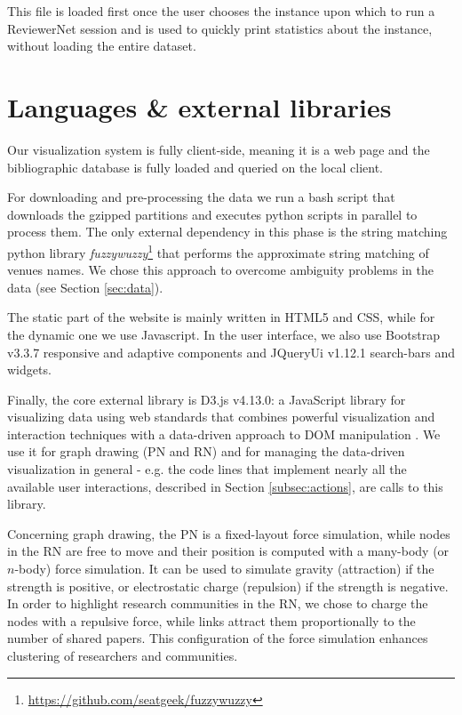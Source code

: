 This file is loaded first once the user chooses the instance upon which to run a ReviewerNet session and is used to quickly print statistics about the instance, without loading the entire dataset.
\section{Languages \& external libraries}
\label{sec:lang}

Our visualization system is fully client-side, meaning it is a web page and the bibliographic database is fully loaded and queried on the local client.

For downloading and pre-processing the data we run a bash script that downloads the gzipped partitions and executes python scripts in parallel to process them. The only external dependency in this phase is the string matching python library \emph{fuzzywuzzy}\footnote{\url{https://github.com/seatgeek/fuzzywuzzy}} that performs the approximate string matching of venues names. We chose this approach to overcome ambiguity problems in the data (see Section \ref{sec:data}).

The static part of the website is mainly written in HTML5 and CSS, while for the dynamic one we use Javascript. In the user interface, we also use Bootstrap v3.3.7 responsive and adaptive components and JQueryUi v1.12.1 search-bars and widgets.

Finally, the core external library is D3.js v4.13.0: a JavaScript library for visualizing data using web standards that combines powerful visualization and interaction techniques with a data-driven approach to DOM manipulation \cite{D3js11}. We use it for graph drawing (PN and RN) and for managing the data-driven visualization in general - e.g. the code lines that implement nearly all the available user interactions, described in Section \ref{subsec:actions}, are calls to this library.

Concerning graph drawing, the PN is a fixed-layout force simulation, while nodes in the RN are free to move and their position is computed with a many-body (or $n$-body) force simulation. It can be used to simulate gravity (attraction) if the strength is positive, or electrostatic charge (repulsion) if the strength is negative. In order to highlight research communities in the RN, we chose to charge the nodes with a repulsive force, while links attract them proportionally to the number of shared papers. This configuration of the force simulation enhances clustering of  researchers and communities. 

